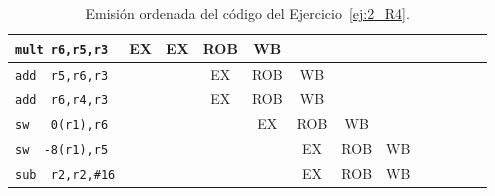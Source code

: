 \begin{ejercicio}
\begin{table}
\begin{tabular}{|l|c|c|c|c|c|c|c|c|c|c|c|c|}
        \hline
        \verb|mult r6,r5,r3|        & EX & EX & ROB & WB & & & \\
        \hline
        \verb|add  r5,r6,r3|        & & & EX & ROB & WB & & \\
        \hline
        \verb|add  r6,r4,r3|        & & & EX & ROB & WB & & \\
        \hline            
        \verb|sw   0(r1),r6|        & & & & EX & ROB & WB & \\
        \hline
        \verb|sw  -8(r1),r5|        & & & & & EX & ROB & WB \\
        \hline
        \verb|sub  r2,r2,#16|       & & & & & EX & ROB & WB\\
        \hline
    \end{tabular}
    \caption{Emisión ordenada del código del Ejercicio~\ref{ej:2_R4}.}
    \label{tab:ej2_R4_1}
\end{table}


\end{ejercicio}
